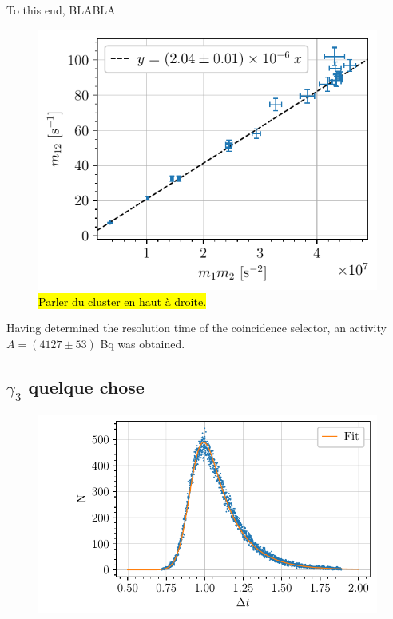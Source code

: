 To this end, BLABLA

\begin{figure}[htbp]
    \centering
    \includegraphics[scale=1]{figures/twotheta_cs137.pdf}
    \caption{\hl{Parler du cluster en haut à droite.}}
    \label{fig:twotheta_cs137}
\end{figure}


Having determined the resolution time of the coincidence selector, an activity $A= (4127 \pm 53)$ Bq was obtained.

\subsection{$\gamma_3$ quelque chose}
\begin{figure}[htbp]
    \centering
    \includegraphics[scale=1]{figures/co57_gamma3_spectrum.pdf}
    \caption{}
    \label{fig:co57_gamma3_spectrum}
\end{figure}
